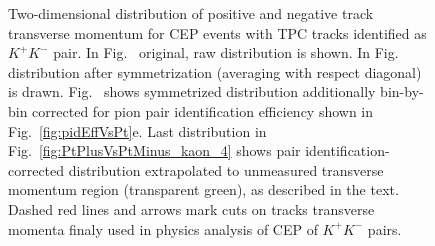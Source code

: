 \begin{figure}[h]
\caption[Two-dimensional distribution of positive and negative track transverse momentum for CEP $K^{+}K^{-}$ events.]{Two-dimensional distribution of positive and negative track transverse momentum for CEP events with TPC tracks identified as $K^{+}K^{-}$ pair. In Fig.~ original, raw distribution is shown. In Fig.~ distribution after symmetrization (averaging with respect diagonal) is drawn. Fig.~ shows symmetrized distribution additionally bin-by-bin corrected for pion pair identification efficiency shown in Fig.~\ref{fig:pidEffVsPt}e. Last distribution in Fig.~\ref{fig:PtPlusVsPtMinus_kaon_4} shows pair identification-corrected distribution extrapolated to unmeasured transverse momentum region (transparent green), as described in the text. Dashed red lines and arrows mark cuts on tracks transverse momenta finaly used in physics analysis of CEP of $K^{+}K^{-}$ pairs.}\label{fig:PtPlusVsPtMinus_kaon}
\end{figure}



